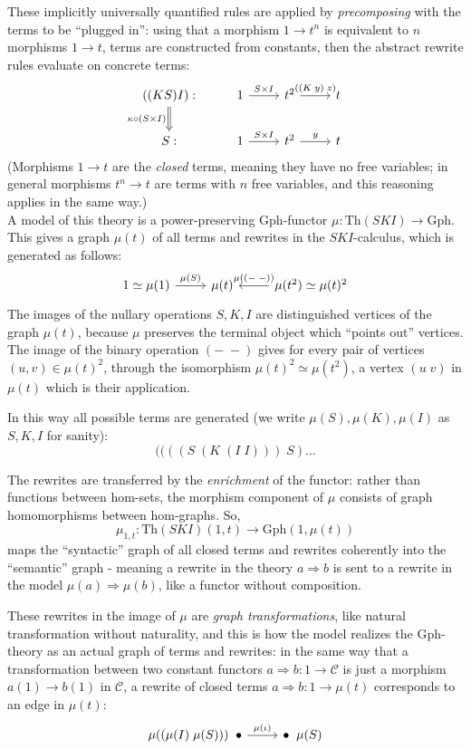 \documentclass[a4paper,UKenglish]{article}
\theoremstyle{definition}
\newcommand{\Th}{\mathrm{Th}}
\newcommand{\Gph}{\mathrm{Gph}}
\newcommand{\C}{\mathscr{C}}
\begin{document}
These implicitly universally quantified rules are applied by \textit{precomposing} with the terms to be ``plugged in'': using that a morphism $1 \to t^n$ is equivalent to $n$ morphisms $1 \to t$, terms are constructed from constants, then the abstract rewrite rules evaluate on concrete terms:
\[
\begin{tikzcd}
	((KS)I): \arrow[Rightarrow,d,swap,"\kappa \circ (S\times I)"] & 1 \arrow[r,"S\times I"] & t^2 \arrow[r,"((K\; y)\; z)"] & t\\
	S: & 1 \arrow[r,"S\times I"] & t^2 \arrow[r,"y"] & t
\end{tikzcd}
\]
(Morphisms $1\to t$ are the \textit{closed} terms, meaning they have no free variables; in general morphisms $t^n\to t$ are terms with $n$ free variables, and this reasoning applies in the same way.)\\

A model of this theory is a power-preserving $\Gph$-functor $\mu: \Th(SKI) \to \Gph$. This gives a graph $\mu(t)$ of all terms and rewrites in the $SKI$-calculus, which is generated as follows:
\[
\begin{tikzcd}
1 \simeq \mu(1) \arrow[r,"\mu(S)"] & \mu(t) & \mu(t^2) \arrow[l,swap,"\mu(\left(-\;-\right))"] \simeq \mu(t)^2
\end{tikzcd}
\]
The images of the nullary operations $S,K,I$ are distinguished vertices of the graph $\mu(t)$, because $\mu$ preserves the terminal object which ``points out'' vertices. The image of the binary operation $(-\; -)$ gives for every pair of vertices $(u,v) \in \mu(t)^2$, through the isomorphism $\mu(t)^2 \simeq \mu(t^2)$, a vertex $(u\; v)$ in $\mu(t)$ which is their application.

In this way all possible terms are generated (we write $\mu(S),\mu(K),\mu(I)$ as $S,K,I$ for sanity): $$((((S\; (K\; (I\; I)))\; S) \dots$$

The rewrites are transferred by the \textit{enrichment} of the functor: rather than functions between hom-sets, the morphism component of $\mu$ consists of graph homomorphisms between hom-graphs. So, $$\mu_{1,t}: \Th(SKI)(1,t)\to \Gph(1,\mu(t))$$ maps the ``syntactic'' graph of all closed terms and rewrites coherently into the ``semantic'' graph - meaning a rewrite in the theory $a\Rightarrow b$ is sent to a rewrite in the model $\mu(a) \Rightarrow \mu(b)$, like a functor without composition.

These rewrites in the image of $\mu$ are \textit{graph transformations}, like natural transformation without naturality, and this is how the model realizes the $\Gph$-theory as an actual graph of terms and rewrites: in the same way that a transformation between two constant functors $a\Rightarrow b: 1\to \C$ is just a morphism $a(1)\to b(1)$ in $\C$, a rewrite of closed terms $a\Rightarrow b: 1\to \mu(t)$ corresponds to an edge in $\mu(t)$:
\[
\begin{tikzcd}
	\mu((\mu(I)\; \mu(S))) \;\; \bullet \arrow[r,"\mu(\iota)"] & \bullet \;\; \mu(S)
\end{tikzcd}
\]
\end{document}
